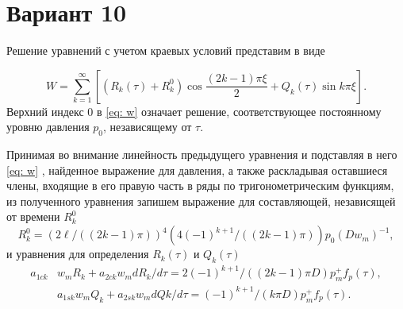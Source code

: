 \documentclass{article}
\begin{document}
\section*{Вариант 10}

Решение уравнений с учетом краевых условий представим в виде

\begin{equation}\label{eq: w}
W = \sum_{k=1}^{\infty} \left[ \left(R_k(\tau) + R_k^0 \right) \cos \frac{(2k-1)\pi\xi}{2} + Q_k(\tau) \sin k\pi\xi \right].
\end{equation}
Верхний индекс 0 в \ref{eq: w} означает решение, соответствующее постоянному уровню давления \(p_0\), независящему от \(\tau\).

Принимая во внимание линейность предыдущего уравнения и подставляя в него \ref{eq: w} , найденное выражение для давления, а также раскладывая оставшиеся члены, входящие в его правую часть в ряды по тригонометрическим функциям, из полученного уравнения запишем выражение для составляющей, независящей от времени \(R_k^0\)
\begin{equation*}
R_k^0 = \left(2\ell / ((2k-1)\pi)\right)^4 \left(4(-1)^{k+1} / ((2k-1)\pi)\right) p_0 (Dw_m)^{-1},
\end{equation*}
и уравнения для определения \(R_k(\tau)\) и \(Q_k(\tau)\)
\begin{align}
a_{1ck} &w_m R_k + a_{2ck} w_m dR_k / d\tau = 2(-1)^{k+1} / ((2k-1)\pi D ) p_m^+ f_p(\tau),\\
&a_{1sk} w_m Q_k + a_{2sk} w_m dQ{k} / d\tau = (-1)^{k+1} / (k \pi D) p_m^+ f_p(\tau).
\end{align}
\end{document}
